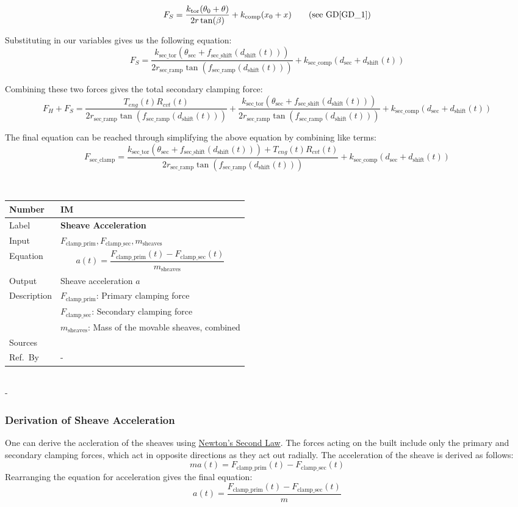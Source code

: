 \documentclass[12pt]{article}
\newcommand{\colAwidth}{0.13\textwidth}
\newcommand{\colBwidth}{0.82\textwidth}
\newcommand{\dref}[1]{GD\ref{#1}}
\newcounter{instnum} %
\newcommand{\definstance}[7] {
~\newline
\noindent
\begin{minipage}{\textwidth}
\renewcommand*{\arraystretch}{1.5}
\begin{tabular}{| p{\colAwidth} | p{\colBwidth}|}
  \hline
  \rowcolor[gray]{0.9}
  Number& IM\refstepcounter{instnum}\theinstnum \label{inst:\theinstnum}\\
  \hline
  Label& \bf #1 \\
  \hline
  Input& #2\\
  \hline
  Equation& #3\\
  \hline
  Output& #4\\
  \hline
  Description& #5 \\
  \hline
  Sources& #6 \\
  \hline
  Ref.\ By & #7\\
  \hline
\end{tabular}
\end{minipage}\\
}
\begin{document}
\[
F_S = \frac{k_{\text{tor}}(\theta_0 + \theta)}{2r\tan(\beta)} + k_\text{comp}(x_0 + x) \tag*{\text{(see \dref{GD_1})}} %
\]

Substituting in our variables gives us the following equation:
\[
F_S = \frac{k_{\text{sec\_tor}} (\theta_{\text{sec}} + f_{\text{sec\_shift}}(d_\text{shift}(t)))}{2 r_{\text{sec\_ramp}} \tan(f_{\text{sec\_ramp}}(d_\text{shift}(t)))} + k_{\text{sec\_comp}} (d_{\text{sec}} + d_\text{shift}(t))
\]

Combining these two forces gives the total secondary clamping force:
\[
F_H + F_S = \frac{T_{eng}(t) R_{cvt}(t)}{2 r_{\text{sec\_ramp}} \tan(f_{\text{sec\_ramp}}(d_\text{shift}(t)))} + \frac{k_{\text{sec\_tor}} (\theta_{\text{sec}} + f_{\text{sec\_shift}}(d_\text{shift}(t)))}{2 r_{\text{sec\_ramp}} \tan(f_{\text{sec\_ramp}}(d_\text{shift}(t)))} + k_{\text{sec\_comp}} (d_{\text{sec}} + d_\text{shift}(t))
\]

The final equation can be reached through simplifying the above equation by combining like terms:
\[
F_{\text{sec\_clamp}} = \frac{k_{\text{sec\_tor}} (\theta_{\text{sec}} + f_{\text{sec\_shift}}(d_\text{shift}(t))) + T_{eng}(t) R_{cvt}(t)}{2 r_{\text{sec\_ramp}} \tan(f_{\text{sec\_ramp}}(d_\text{shift}(t)))} + k_{\text{sec\_comp}} (d_{\text{sec}} + d_\text{shift}(t))
\]

\definstance
{Sheave Acceleration}
{$F_{\text{clamp\_prim}}, F_{\text{clamp\_sec}}, m_\text{sheaves}$} %
{\[a(t) = \frac{F_{\text{clamp\_prim}}(t) - F_{\text{clamp\_sec}}(t)}{m_\text{sheaves}}\]} %
{Sheave acceleration $a$} %
{$F_{\text{clamp\_prim}}$: Primary clamping force\\
  &$F_{\text{clamp\_sec}}$: Secondary clamping force\\
  &$m_\text{sheaves}$: Mass of the movable sheaves, combined} %
{} %
{-}
{} %
{} %
{-}

\subsubsection*{Derivation of Sheave Acceleration}
One can derive the accleration of the sheaves using \hyperref[TM:N2]{Newton's Second Law}. The forces acting on the built include 
only the primary and secondary clamping forces, which act in opposite directions as they act out radially.
The acceleration of the sheave is derived as follows:
\[ma(t) = F_{\text{clamp\_prim}}(t) - F_{\text{clamp\_sec}}(t)\]
Rearranging the equation for acceleration gives the final equation:
\[a(t) = \frac{F_{\text{clamp\_prim}}(t) - F_{\text{clamp\_sec}}(t)}{m}\]
\end{document}
